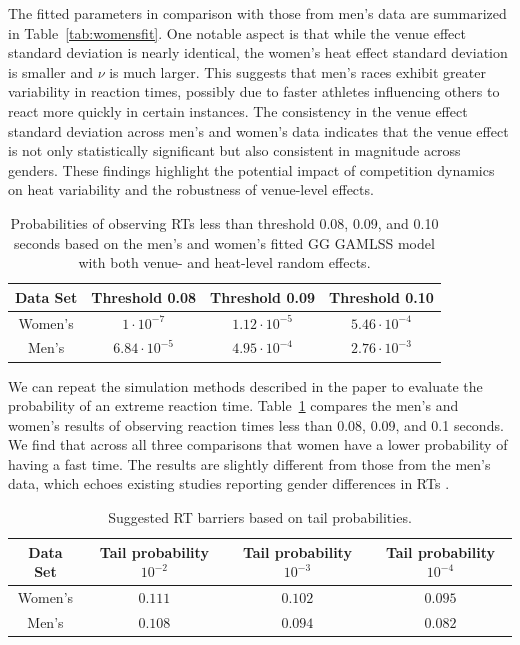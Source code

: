 \documentclass[12pt, letterpaper]{article}
\begin{document}
The fitted parameters in comparison with those from men's data are
summarized in Table~\ref{tab:womensfit}.  One notable aspect is that while
the venue effect standard deviation is nearly identical, the women's heat effect
standard deviation is smaller and $\nu$ is much larger.
This suggests that men’s races exhibit greater 
variability in reaction times, possibly due to faster athletes influencing others 
to react more quickly in certain instances. The consistency in the venue effect 
standard deviation across men’s and women’s data indicates that the venue effect 
is not only statistically significant but also consistent in magnitude across 
genders. These findings highlight the potential impact of competition dynamics 
on heat variability and the robustness of venue-level effects.


\begin{table}
  \centering
  \caption{Probabilities of observing RTs less than threshold 0.08,
  0.09, and 0.10 seconds based on the men's and women's
    fitted GG GAMLSS model with both venue- and heat-level
random effects.}
  \begin{tabular}{c c c c}
   \toprule
   Data Set & Threshold 0.08 & Threshold 0.09 & Threshold 0.10  \\
   \midrule
   Women's & $1\cdot10^{-7}$ & $1.12\cdot10^{-5}$ &  $5.46\cdot10^{-4}$  \\
   Men's   & $6.84\cdot10^{-5}$ & $4.95\cdot10^{-4}$ & $2.76\cdot10^{-3}$ \\
   \bottomrule
  \end{tabular}
  \label{tab:Sim_prob_women}
\end{table}

We can repeat the simulation methods described in the paper to evaluate
the probability of an extreme reaction time.  Table~\ref{tab:Sim_prob_women}
compares the men's and women's results of observing reaction times less than
0.08, 0.09, and 0.1 seconds.  We find that across all three comparisons that
women have a lower probability of having a fast time. The results are slightly
different from those from the men's data, which echoes existing studies
reporting gender differences in RTs \citep[e.g.,][]{lipps2011implications,
babicc2009reaction, panoutsakopoulos2020gender}.



\begin{table}
  \centering
  \caption{Suggested RT barriers based on tail probabilities.}
  \begin{tabular}{c c c c}
   \toprule
   Data Set & Tail probability  $10^{-2}$ & Tail probability  $10^{-3}$ & Tail probability $10^{-4}$ \\
   \midrule
   Women's & $0.111$ & $0.102$ & $0.095$ \\
   Men's   & $0.108$ & $0.094$ & $0.082$ \\
   \bottomrule
  \end{tabular}
  \label{tab:Sim_time_women}
\end{table}
\end{document}
